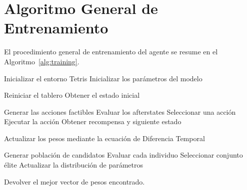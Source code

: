 \section{Algoritmo General de Entrenamiento}
\label{sec:algoritmo}

El procedimiento general de entrenamiento del agente se resume en el Algoritmo~\ref{alg:training}.

\begin{algorithm}[H]
\caption{Entrenamiento del Agente}
\label{alg:training}
\begin{algorithmic}[1]

\State Inicializar el entorno Tetris
\State Inicializar los parámetros del modelo


    \State Reiniciar el tablero
    \State Obtener el estado inicial


        \State Generar las acciones factibles
        \State Evaluar los afterstates
        \State Seleccionar una acción
        \State Ejecutar la acción
        \State Obtener recompensa y siguiente estado

            \State Actualizar los pesos mediante la ecuación de Diferencia Temporal
        \EndIf

    \EndWhile

\EndFor

    \State Generar población de candidatos
    \State Evaluar cada individuo
    \State Seleccionar conjunto élite
    \State Actualizar la distribución de parámetros
\EndIf

\State Devolver el mejor vector de pesos encontrado.

\end{algorithmic}
\end{algorithm}
